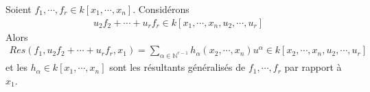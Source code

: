             \begin{defi}
                Soient $f_1, \cdots, f_r \in k[x_1, \cdots, x_n]$. Considérons 
                \begin{align*}
                    u_2f_2 + \cdots + u_rf_r \in k[x_1, \cdots, x_n, u_2, \cdots, u_r]
                \end{align*}
                Alors
                \begin{align*}
                    Res(f_1, u_2f_2 + \cdots + u_rf_r, x_1) = \sum_{\alpha \in \mathbb{N}^{r-1}} h_\alpha(x_2, \cdots, x_n) u^\alpha \in k[x_2, \cdots, x_n, u_2, \cdots, u_r]
                \end{align*}
                et les $h_\alpha \in k[x_1, \cdots, x_n]$ sont les résultants généralisés de $f_1, \cdots, f_r$ par rapport à $x_1$.
            \end{defi}
